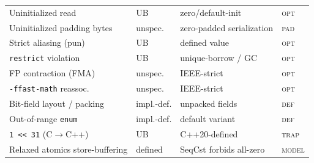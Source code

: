 \documentclass[10pt,a4paper]{article}
\begin{document}
\begin{table}[t]
\begin{tabular}{@{}llll@{}}
Uninitialized read         & UB & zero/default-init   & \textsc{opt} \\
Uninitialized padding bytes & unspec. & zero-padded serialization & \textsc{pad} \\
Strict aliasing (pun)      & UB & defined value       & \textsc{opt} \\
\texttt{restrict} violation & UB & unique-borrow / GC  & \textsc{opt} \\
FP contraction (FMA)       & unspec. & IEEE-strict     & \textsc{opt} \\
\texttt{-ffast-math} reassoc.& unspec. & IEEE-strict   & \textsc{opt} \\
Bit-field layout / packing & impl.-def. & unpacked fields & \textsc{def} \\
Out-of-range \texttt{enum} & impl.-def. & default variant & \textsc{def} \\
\texttt{1 << 31} (C$\to$C++) & UB & C++20-defined       & \textsc{trap} \\
Relaxed atomics store-buffering & defined & SeqCst forbids all-zero & \textsc{model} \\
\bottomrule
\end{tabular}
\end{table}
\end{document}
